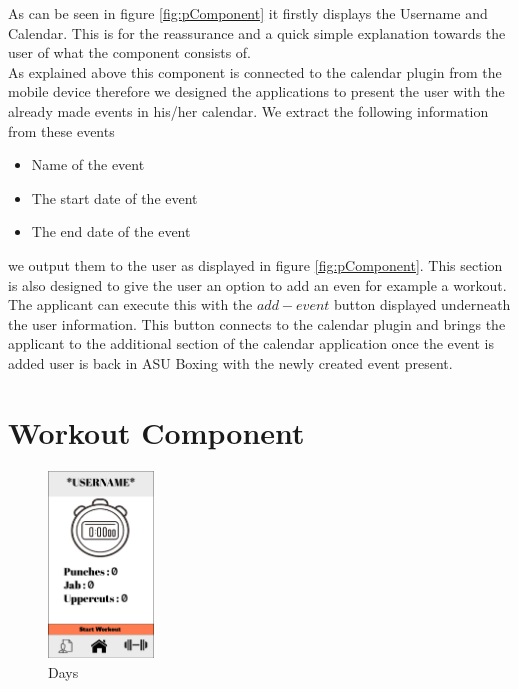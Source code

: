 \documentclass[a4paper,12pt]{report}
\begin{document}
As can be seen in figure \ref{fig:pComponent} it firstly displays the Username and Calendar. This is for the reassurance and a quick simple explanation towards the user of what the component consists of.\\
As explained above this component is connected to the calendar plugin from the mobile device therefore we designed the applications to present the user with the already made events in his/her calendar.
We extract the following information from these events 
\begin{itemize}
    \item Name of the event
    \item The start date of the event
    \item The end date of the event
\end{itemize}
we output them to the user as displayed in figure \ref{fig:pComponent}.
This section is also designed to give the user an option to add an even for example a workout. The applicant can execute this with the $add-event$ button displayed underneath the user information.
This button connects to the calendar plugin and brings the applicant to the additional section of the calendar application once the event is added user is back in  ASU Boxing with the newly created event present.

\section{Workout Component}

\begin{figure}
\centering
\includegraphics[width=0.25\textwidth]{images/workoutBorder.png}
\caption{\label{fig:isWComponent}Days}
\end{figure}
\end{document}
